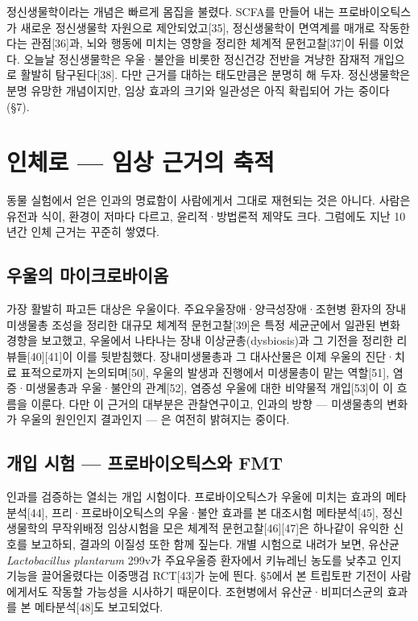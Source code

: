 \documentclass[12pt,oneside]{book}
\begin{document}
정신생물학이라는 개념은 빠르게 몸집을 불렸다. SCFA를 만들어 내는 프로바이오틱스가 새로운 정신생물학 자원으로 제안되었고[35], 정신생물학이 면역계를 매개로 작동한다는 관점[36]과, 뇌와 행동에 미치는 영향을 정리한 체계적 문헌고찰[37]이 뒤를 이었다. 오늘날 정신생물학은 우울·불안을 비롯한 정신건강 전반을 겨냥한 잠재적 개입으로 활발히 탐구된다[38]. 다만 근거를 대하는 태도만큼은 분명히 해 두자. 정신생물학은 분명 유망한 개념이지만, 임상 효과의 크기와 일관성은 아직 확립되어 가는 중이다(§7).

\section{인체로 — 임상 근거의 축적}

동물 실험에서 얻은 인과의 명료함이 사람에게서 그대로 재현되는 것은 아니다. 사람은 유전과 식이, 환경이 저마다 다르고, 윤리적·방법론적 제약도 크다. 그럼에도 지난 10년간 인체 근거는 꾸준히 쌓였다.

\subsection{우울의 마이크로바이옴}

가장 활발히 파고든 대상은 우울이다. 주요우울장애·양극성장애·조현병 환자의 장내미생물총 조성을 정리한 대규모 체계적 문헌고찰[39]은 특정 세균군에서 일관된 변화 경향을 보고했고, 우울에서 나타나는 장내 이상균총(dysbiosis)과 그 기전을 정리한 리뷰들[40][41]이 이를 뒷받침했다. 장내미생물총과 그 대사산물은 이제 우울의 진단·치료 표적으로까지 논의되며[50], 우울의 발생과 진행에서 미생물총이 맡는 역할[51], 염증·미생물총과 우울·불안의 관계[52], 염증성 우울에 대한 비약물적 개입[53]이 이 흐름을 이룬다. 다만 이 근거의 대부분은 관찰연구이고, 인과의 방향 — 미생물총의 변화가 우울의 원인인지 결과인지 — 은 여전히 밝혀지는 중이다.

\subsection{개입 시험 — 프로바이오틱스와 FMT}

인과를 검증하는 열쇠는 개입 시험이다. 프로바이오틱스가 우울에 미치는 효과의 메타분석[44], 프리·프로바이오틱스의 우울·불안 효과를 본 대조시험 메타분석[45], 정신생물학의 무작위배정 임상시험을 모은 체계적 문헌고찰[46][47]은 하나같이 유익한 신호를 보고하되, 결과의 이질성 또한 함께 짚는다. 개별 시험으로 내려가 보면, 유산균 \textit{Lactobacillus plantarum} 299v가 주요우울증 환자에서 키뉴레닌 농도를 낮추고 인지 기능을 끌어올렸다는 이중맹검 RCT[43]가 눈에 띈다. §5에서 본 트립토판 기전이 사람에게서도 작동할 가능성을 시사하기 때문이다. 조현병에서 유산균·비피더스균의 효과를 본 메타분석[48]도 보고되었다.
\end{document}
